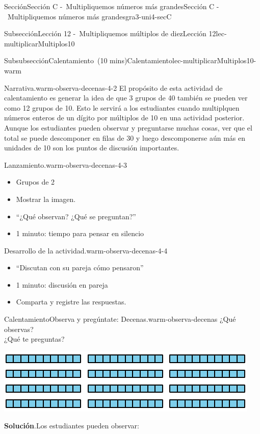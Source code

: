 \documentclass[oneside,10pt,]{article}
\newcommand{\blocktitlefont}{\relax}
\begin{document}
\begin{sectionptx}{Sección}{Sección C -~Multipliquemos números más grandes}{}{Sección C -~Multipliquemos números más grandes}{}{}{gra3-uni4-secC}
\begin{subsectionptx}{Subsección}{Lección 12 -~Multipliquemos múltiplos de diez}{}{Lección 12}{}{}{lec-multiplicarMultiplos10}
\begin{subsubsectionptx}{Subsubsección}{Calentamiento~(10 mins)}{}{Calentamiento}{}{}{lec-multiplicarMultiplos10-warm}
\begin{paragraphs}{Narrativa.}{warm-observa-decenas-4-2}
El propósito de esta actividad de calentamiento es generar la idea de que 3 grupos de 40 también se pueden ver como 12 grupos de 10. Esto le servirá a los estudiantes cuando multiplquen números enteros de un dígito por múltiplos de 10 en una actividad posterior. Aunque los estudiantes pueden observar y preguntarse muchas cosas, ver que el total se puede descomponer en filas de 30 y luego descomponerse aún más en unidades de 10 son los puntos de discusión importantes.%
\end{paragraphs}%
\begin{paragraphs}{Lanzamiento.}{warm-observa-decenas-4-3}%
%
\begin{itemize}[label=\textbullet]
\item{}Grupos de 2%
\item{}Mostrar la imagen.%
\item{}``¿Qué observan? ¿Qué se preguntan?''%
\item{}1 minuto: tiempo para pensar en silencio%
\end{itemize}
\end{paragraphs}%
\begin{paragraphs}{Desarrollo de la actividad.}{warm-observa-decenas-4-4}%
%
\begin{itemize}[label=\textbullet]
\item{}``Discutan con su pareja cómo pensaron''%
\item{}1 minuto: discusión en pareja%
\item{}Comparta y registre las respuestas.%
\end{itemize}
\end{paragraphs}%
\begin{exploration}{Calentamiento}{Observa y pregúntate: Decenas.}{warm-observa-decenas}%
¿Qué observas?\\
 ¿Qué te preguntas?%
\begin{image}{0}{1}{0}{}%
\includegraphics[width=\linewidth]{external/svg-source/tikz-file-149355-scale13.pdf}
\end{image}%
\par\smallskip%
\noindent\textbf{\blocktitlefont Solución}.\hypertarget{warm-observa-decenas-3}{}\quad{}Los estudiantes pueden observar:%

\end{exploration}
\end{subsubsectionptx}
\end{subsectionptx}
\end{sectionptx}
\end{document}
